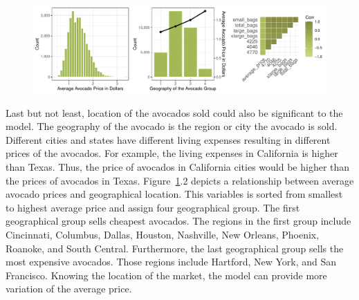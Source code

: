 \documentclass[11pt]{article}\usepackage[]{graphicx}\usepackage[]{color}
\makeatletter
\def\maxwidth{ %
  \ifdim\Gin@nat@width>\linewidth
    \linewidth
  \else
    \Gin@nat@width
  \fi
}
\makeatother
\begin{document}
\begin{figure}[h!] 
\begin{center}

\includegraphics[width=\maxwidth]{figure/unnamed-chunk-2-1} 

\caption{}
\label{explore2}
\end{center} 
\end{figure}

Last but not least, location of the avocados sold could also be significant to the model. The geography of the avocado is the region or city the avocado is sold. Different cities and states have different living expenses resulting in different prices of the avocados. For example, the living expenses in California is higher than Texas. Thus, the price of avocados in California cities would be higher than the prices of avocados in Texas. Figure~\ref{explore2}.2 depicts a relationship between average avocado prices and geographical location. This variables is sorted from smallest to highest average price and assign four geographical group. The first geographical group sells cheapest avocados. The regions in the first group include Cincinnati, Columbus, Dallas, Houston, Nashville, New Orleans, Phoenix, Roanoke, and South Central. Furthermore, the last geographical group sells the most expensive avocados. Those regions include Hartford, New York, and San Francisco. Knowing the location of the market, the model can provide more variation of the average price.         
\hfill \break
\end{document}
